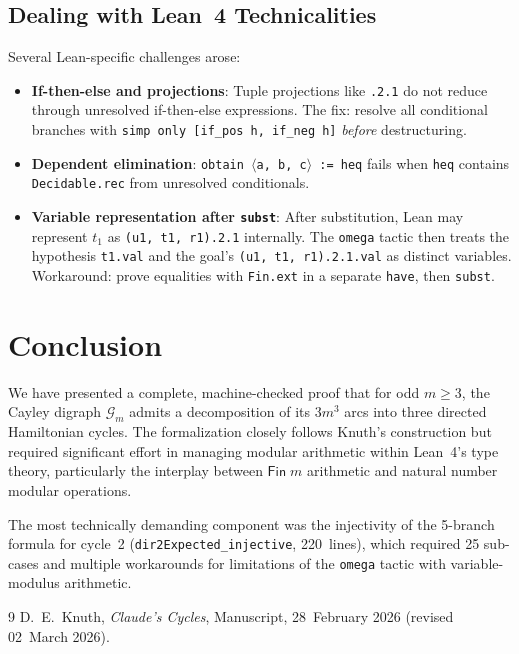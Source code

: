 \documentclass[11pt,a4paper]{article}
\begin{document}
\subsection{Dealing with Lean~4 Technicalities}

Several Lean-specific challenges arose:
\begin{itemize}
  \item \textbf{If-then-else and projections}: Tuple projections like \texttt{.2.1}
    do not reduce through unresolved if-then-else expressions.
    The fix: resolve all conditional branches with
    \texttt{simp only [if\_pos h, if\_neg h]} \emph{before} destructuring.
  \item \textbf{Dependent elimination}: \texttt{obtain $\langle$a, b, c$\rangle$ := heq} fails
    when \texttt{heq} contains \texttt{Decidable.rec} from unresolved conditionals.
  \item \textbf{Variable representation after \texttt{subst}}: After substitution,
    Lean may represent $t_1$ as \texttt{(u1, t1, r1).2.1} internally.
    The \texttt{omega} tactic then treats the hypothesis \texttt{t1.val} and the
    goal's \texttt{(u1, t1, r1).2.1.val} as distinct variables.
    Workaround: prove equalities with \texttt{Fin.ext} in a separate \texttt{have},
    then \texttt{subst}.
\end{itemize}

\section{Conclusion}

We have presented a complete, machine-checked proof that for odd $m \ge 3$,
the Cayley digraph $\mathcal{G}_m$ admits a decomposition of its $3m^3$ arcs into
three directed Hamiltonian cycles.  The formalization closely follows Knuth's
construction but required significant effort in managing modular arithmetic
within Lean~4's type theory, particularly the interplay between
$\mathsf{Fin}\;m$ arithmetic and natural number modular operations.

The most technically demanding component was the injectivity of the 5-branch
formula for cycle~2 (\texttt{dir2Expected\_injective}, 220~lines), which
required 25 sub-cases and multiple workarounds for limitations of the
\texttt{omega} tactic with variable-modulus arithmetic.

\begin{thebibliography}{9}
  D.~E.~Knuth,
  \textit{Claude's Cycles},
  Manuscript, 28~February 2026 (revised 02~March 2026).
\end{thebibliography}
\end{document}
